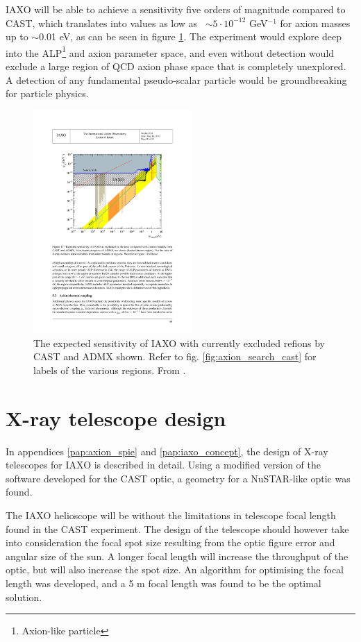 IAXO will be able to achieve a sensitivity five orders of magnitude compared to CAST, which translates into \gay values as low as \gay\ $\sim5\cdot10^{-12}$ GeV$^{-1}$ for axion masses up to $\sim$0.01 eV, as can be seen in figure \ref{fig:iaxo_search}. The experiment would explore deep into the ALP\footnote{Axion-like particle} and axion parameter space, and even without detection would exclude a large region of QCD axion phase space that is completely unexplored. A detection of any fundamental pseudo-scalar particle would be groundbreaking for particle physics.

\begin{figure}[!h]
  \center
\includegraphics[height=8.5cm]{figures/iaxo/iaxo_axion_search.pdf}
\caption{\footnotesize The expected sensitivity of IAXO with currently excluded refions by CAST and ADMX\cite{Asztalos:2001ty} shown. Refer to fig. \ref{fig:axion_search_cast} for labels of the various regions. From \cite{Irastorza:2013uu}.}\label{fig:iaxo_search}
\end{figure}

\section{X-ray telescope design}
In appendices \ref{pap:axion_spie} and \ref{pap:iaxo_concept}, the design of X-ray telescopes for IAXO is described in detail. Using a modified version of the software developed for the CAST optic, a geometry for a NuSTAR-like optic was found.

The IAXO helioscope will be without the limitations in telescope focal length found in the CAST experiment. The design of the telescope should however take into consideration the focal spot size resulting from the optic figure error and angular size of the sun. A longer focal length will increase the throughput of the optic, but will also increase the spot size. An algorithm for optimising the focal length was developed, and a 5 m focal length was found to be the optimal solution.


